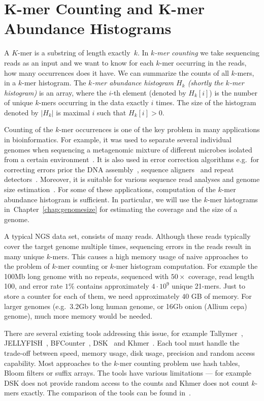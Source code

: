\chapter[K-mer Counting]{K-mer Counting and K-mer Abundance Histograms}

A $K$-mer is a substring of length exactly~$k$. In \emph{$k$-mer counting} we take sequencing reads as an input and we want to know for each $k$-mer occurring in the reads, how many occurrences does it have. We can summarize the counts of all $k$-mers, in a $k$-mer histogram.
The \emph{$k$-mer abundance histogram $H_k$ (shortly the $k$-mer histogram)} is an array, where the $i$-th element (denoted by $H_k[i]$) is the number of unique $k$-mers occurring in the data exactly $i$ times. The size of the histogram denoted by $|H_k|$ is maximal $i$ such that $H_k[i] > 0$.

Counting of the $k$-mer occurrences is one of the key problem in many applications in bioinformatics.
For example, it was used to separate several individual
genomes when sequencing a metagenomic mixture of different microbes isolated from a certain environment~\cite{Wu2011, Wang2012}.
It is also used in error correction algorithms e.g.\ for correcting errors prior the DNA assembly~\cite{Pevzner2001}, sequence aligners~\cite{edgar2004muscle} and repeat detectors~\cite{caponnetto2013efficiency}.
Moreover, it is suitable for various sequence read analyses and genome size estimation~\cite{covest, williams, waterman}.
For some of these applications, computation of the $k$-mer abundance histogram is sufficient.
In particular, we will use the $k$-mer histograms in~Chapter~\ref{chap:genomesize} for estimating the coverage and the size of a genome.

A typical NGS data set, consists of many reads. Although these reads typically cover the target genome multiple times, sequencing errors in the reads result in many unique $k$-mers.
This causes a high memory usage of naive approaches to the problem of $k$-mer counting or $k$-mer histogram computation.
For example the 100Mb long genome with no repeats, sequenced with $50\times$ coverage, read length 100, and error rate $1\%$ contains approximately $4\cdot 10^9$ unique 21-mers. Just to store a counter for each of them, we need approximately $40$ GB of memory. For larger genomes (e.g.\ 3.2Gb long human genome, or 16Gb onion (Allium cepa) genome), much more memory would be needed.

There are several existing tools addressing this issue, for example Tallymer~\cite{tallymer}, JELLYFISH~\cite{jellyfish}, BFCounter~\cite{bfcounter}, DSK~\cite{dsk} and Khmer~\cite{khmer}. Each tool must handle the trade-off between speed, memory usage, disk usage, precision and random access capability. Most approaches to the $k$-mer counting problem use hash tables, Bloom filters or suffix arrays.
The tools have various limitations --- for example DSK does not provide random access to the counts and Khmer does not count $k$-mers exactly.
The comparison of the tools can be found in~\cite{khmer}.

